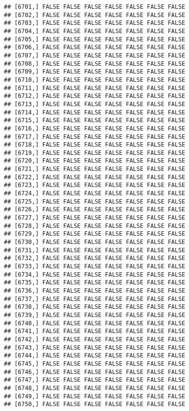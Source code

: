 \documentclass[
]{article}
\begin{document}
\begin{verbatim}
## [6701,] FALSE FALSE FALSE FALSE FALSE FALSE FALSE
## [6702,] FALSE FALSE FALSE FALSE FALSE FALSE FALSE
## [6703,] FALSE FALSE FALSE FALSE FALSE FALSE FALSE
## [6704,] FALSE FALSE FALSE FALSE FALSE FALSE FALSE
## [6705,] FALSE FALSE FALSE FALSE FALSE FALSE FALSE
## [6706,] FALSE FALSE FALSE FALSE FALSE FALSE FALSE
## [6707,] FALSE FALSE FALSE FALSE FALSE FALSE FALSE
## [6708,] FALSE FALSE FALSE FALSE FALSE FALSE FALSE
## [6709,] FALSE FALSE FALSE FALSE FALSE FALSE FALSE
## [6710,] FALSE FALSE FALSE FALSE FALSE FALSE FALSE
## [6711,] FALSE FALSE FALSE FALSE FALSE FALSE FALSE
## [6712,] FALSE FALSE FALSE FALSE FALSE FALSE FALSE
## [6713,] FALSE FALSE FALSE FALSE FALSE FALSE FALSE
## [6714,] FALSE FALSE FALSE FALSE FALSE FALSE FALSE
## [6715,] FALSE FALSE FALSE FALSE FALSE FALSE FALSE
## [6716,] FALSE FALSE FALSE FALSE FALSE FALSE FALSE
## [6717,] FALSE FALSE FALSE FALSE FALSE FALSE FALSE
## [6718,] FALSE FALSE FALSE FALSE FALSE FALSE FALSE
## [6719,] FALSE FALSE FALSE FALSE FALSE FALSE FALSE
## [6720,] FALSE FALSE FALSE FALSE FALSE FALSE FALSE
## [6721,] FALSE FALSE FALSE FALSE FALSE FALSE FALSE
## [6722,] FALSE FALSE FALSE FALSE FALSE FALSE FALSE
## [6723,] FALSE FALSE FALSE FALSE FALSE FALSE FALSE
## [6724,] FALSE FALSE FALSE FALSE FALSE FALSE FALSE
## [6725,] FALSE FALSE FALSE FALSE FALSE FALSE FALSE
## [6726,] FALSE FALSE FALSE FALSE FALSE FALSE FALSE
## [6727,] FALSE FALSE FALSE FALSE FALSE FALSE FALSE
## [6728,] FALSE FALSE FALSE FALSE FALSE FALSE FALSE
## [6729,] FALSE FALSE FALSE FALSE FALSE FALSE FALSE
## [6730,] FALSE FALSE FALSE FALSE FALSE FALSE FALSE
## [6731,] FALSE FALSE FALSE FALSE FALSE FALSE FALSE
## [6732,] FALSE FALSE FALSE FALSE FALSE FALSE FALSE
## [6733,] FALSE FALSE FALSE FALSE FALSE FALSE FALSE
## [6734,] FALSE FALSE FALSE FALSE FALSE FALSE FALSE
## [6735,] FALSE FALSE FALSE FALSE FALSE FALSE FALSE
## [6736,] FALSE FALSE FALSE FALSE FALSE FALSE FALSE
## [6737,] FALSE FALSE FALSE FALSE FALSE FALSE FALSE
## [6738,] FALSE FALSE FALSE FALSE FALSE FALSE FALSE
## [6739,] FALSE FALSE FALSE FALSE FALSE FALSE FALSE
## [6740,] FALSE FALSE FALSE FALSE FALSE FALSE FALSE
## [6741,] FALSE FALSE FALSE FALSE FALSE FALSE FALSE
## [6742,] FALSE FALSE FALSE FALSE FALSE FALSE FALSE
## [6743,] FALSE FALSE FALSE FALSE FALSE FALSE FALSE
## [6744,] FALSE FALSE FALSE FALSE FALSE FALSE FALSE
## [6745,] FALSE FALSE FALSE FALSE FALSE FALSE FALSE
## [6746,] FALSE FALSE FALSE FALSE FALSE FALSE FALSE
## [6747,] FALSE FALSE FALSE FALSE FALSE FALSE FALSE
## [6748,] FALSE FALSE FALSE FALSE FALSE FALSE FALSE
## [6749,] FALSE FALSE FALSE FALSE FALSE FALSE FALSE
## [6750,] FALSE FALSE FALSE FALSE FALSE FALSE FALSE

\end{verbatim}
\end{document}
